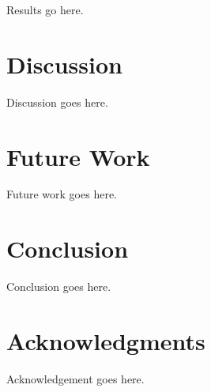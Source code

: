 \documentclass{chi2009}
\begin{document}

Results go here.

\section{Discussion}

Discussion goes here.

\section{Future Work}

Future work goes here.

\section{Conclusion}

Conclusion goes here.

\section{Acknowledgments}

Acknowledgement goes here.



\end{document}
